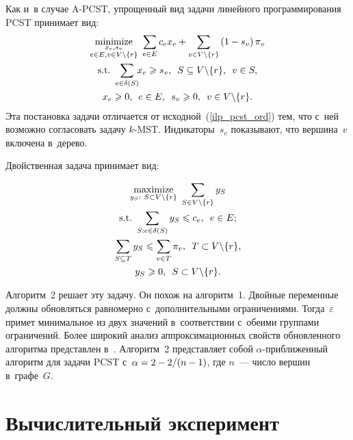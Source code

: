 \begin{multicols}{2}
Как и~в случае A-PCST, упрощенный вид задачи линейного 
программирования PCST принимает вид:
\begin{multline*}
\underset{\substack{x_e,s_v \\ e\in E, v\in V\backslash \{r\}}}{\mbox{minimize}}\  
\displaystyle \sum\limits_{e\in E}c_ex_e + \sum\limits_{v\in V\backslash\{r\}} \left(1-s_v\right)\pi_v \\
\mbox{s.t.}\  \displaystyle \sum\limits_{e\in\delta(S)} \!\! x_e\geqslant s_v,\enskip S\subseteq V\backslash \{r\},\enskip v\in S,\\
x_e\geqslant 0,\enskip e\in E,\enskip s_v\geqslant 0,\enskip v\in V\backslash \{r\}.
\end{multline*}
Эта постановка задачи отличается от исходной~(\ref{ilp_pcst_ord}) тем, что с~ней 
возможно согласовать задачу $k$-MST. Индикаторы~$s_v$ показывают, что 
вершина~$v$ включена в~дерево.

Двойственная задача принимает вид:

\vspace*{-3pt}

\noindent
\begin{multline*}
\underset{\substack{y_S:~S\subset V\backslash\{r\}}}{\mbox{maximize}}\ 
\displaystyle \sum\limits_{S\in V\backslash\{r\}}y_S \\
\mbox{s.t.}\  \displaystyle \sum\limits_{S:e\in\delta(S)}y_S\leqslant c_e ,\enskip e\in E;\\
 \displaystyle \sum\limits_{S\subseteq T}y_S\leqslant \sum\limits_{v\in T}\pi_v,\enskip  T\subset  V\backslash\{r\},\\
 y_S\geqslant 0,\enskip  S\subset V\backslash\{r\}.
\end{multline*}

\vspace*{-3pt}

Алгоритм~2 решает эту задачу. Он похож на 
алгоритм~1. Двойные переменные должны обновляться равномерно 
с~дополнительными ограничениями. Тогда~$\varepsilon$ примет минимальное из двух 
значений в~соответствии с~обеими группами ограничений.
Более широкий анализ аппроксимационных свойств обновленного алгоритма 
представлен в~\cite{goemans1995general}. Алгоритм~2 представляет 
собой $\alpha$-приближенный алгоритм для задачи PCST с~$\alpha \hm= 2 \hm- 
{2}/({n-1})$, где $n$~--- число вершин в~графе~$G$.

\vspace*{-9pt}

\section{Вычислительный эксперимент}


\end{multicols}
